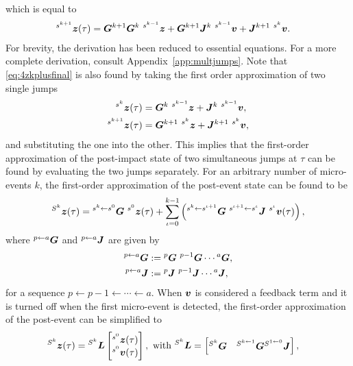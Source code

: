 \documentclass[../DC2017114Bouma.tex]{subfiles}
\begin{document}
which is equal to
\begin{align}
&\ls^{s^{k+1}}\zb(\tau) = \Gb^{k+1}\Gb^k\ ^{s^{k-1}}\zb + \Gb^{k+1}\Jb^{k}\ ^{s^{k-1}}\vb + \Jb^{k+1}\ ^{s^{k}}\vb.\label{eq:4zkplusfinal}
\end{align}
For brevity, the derivation has been reduced to essential equations. For a more complete derivation, consult Appendix~\ref{app:multjumps}. Note that \eqref{eq:4zkplusfinal} is also found by taking the first order approximation of two single jumps
\begin{align}
\ls^{s^{k}}\zb(\tau) &= \Gb^k\ ^{s^{k-1}}\zb + \Jb^{k}\ ^{s^{k-1}}\vb,\\
\ls^{s^{k+1}}\zb(\tau) &= \Gb^{k+1}\ ^{s^{k}}\zb + \Jb^{k+1}\ ^{s^{k}}\vb,
\end{align}
and substituting the one into the other. This implies that the first-order approximation of the post-impact state of two simultaneous jumps at $\tau$ can be found by evaluating the two jumps separately. For an arbitrary number of micro-events $k$, the first-order approximation of the post-event state can be found to be
\begin{align}
\ls^{S^k}\zb(\tau) = \ls^{s^k\leftarrow s^0}\Gb\ ^{s^0}\zb(\tau) + \sum_{\iota=0}^{k-1}\left(\ls^{s^{k}\leftarrow s^{\iota+1}}\Gb\ ^{s^{\iota+1}\leftarrow s^{\iota}}\Jb\ ^{s^{\iota}}\vb(\tau)\right),\label{eq:4ljumps}
\end{align}
where $\hspace{0cm}^{p\leftarrow a}{\boldsymbol{G}}$ and $\hspace{0cm}^{p\leftarrow a}{\boldsymbol{J}}$ are given by
\begin{align}
\hspace{0cm}^{p\leftarrow a}{\boldsymbol{G}} &:= \hspace{0cm}^{p}{\boldsymbol{G}}\ ^{p-1}{\boldsymbol{G}}\cdots\hspace{0cm}^{a}{\boldsymbol{G}},\\
\hspace{0cm}^{p\leftarrow a}{\boldsymbol{J}} &:= \hspace{0cm}^{p}{\boldsymbol{J}}\ ^{p-1}{\boldsymbol{J}}\cdots\hspace{0cm}^{a}{\boldsymbol{J}},
\end{align}
for a sequence $p\leftarrow p-1 \leftarrow \cdots \leftarrow a$. When ${\boldsymbol{v}}$ is considered a feedback term and it is turned off when the first micro-event is detected, the first-order approximation of the post-event can be simplified to
\begin{align}
\hspace{0cm}^{S^k}{\boldsymbol{z}}(\tau) &= \hspace{0cm}^{S^k}{\boldsymbol{L}} \begin{bmatrix}
\hspace{0cm}^{s^0}{\boldsymbol{z}}(\tau) \\ \hspace{0cm}^{s^0}{\boldsymbol{v}}(\tau)
\end{bmatrix}, \text{ with }\hspace{0cm}^{S^k}{\boldsymbol{L}} = \begin{bmatrix}
\hspace{0cm}^{S^k}{\boldsymbol{G}} & \hspace{0cm}^{S^{k\leftarrow 1}}{\boldsymbol{G}}\hspace{0cm}^{S^{1\leftarrow 0}}{\boldsymbol{J}}
\end{bmatrix},\label{eq:4ljumpssimp}
\end{align}
\end{document}
